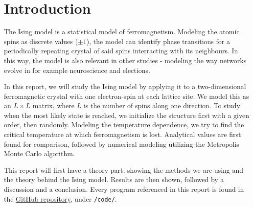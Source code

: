 \documentclass[../main.tex]{subfiles}
\begin{document}
\section{Introduction}
The Ising model is a statistical model of ferromagnetism. Modeling the atomic spins as discrete values ($\pm 1$), the model can identify phase transitions for a periodically repeating crystal of said spins interracting with its neighbours. In this way, the model is also relevant in other studies - modeling the way networks evolve in for example neuroscience and elections.

\noindent In this report, we will study the Ising model by applying it to a two-dimensional ferromagnetic crystal with one electron-spin at each lattice site. We model this as an $L \times L$ matrix, where $L$ is the number of spins along one direction. To study when the most likely state is reached, we initialize the structure first with a given order, then randomly. Modeling the temperature dependence, we try to find the critical temperature at which ferromagnetism is lost. Analytical values are first found for comparison, followed by numerical modeling utilizing the Metropolis Monte Carlo algorithm.

\noindent This report will first have a theory part, showing the methods we are using and the theory behind the Ising model. Results are then shown, followed by a discussion and a conclusion. Every program referenced in this report is found in the \href{https://github.com/kmaasrud/Project-4}{GitHub repository}, under \verb+/code/+.
\end{document}
